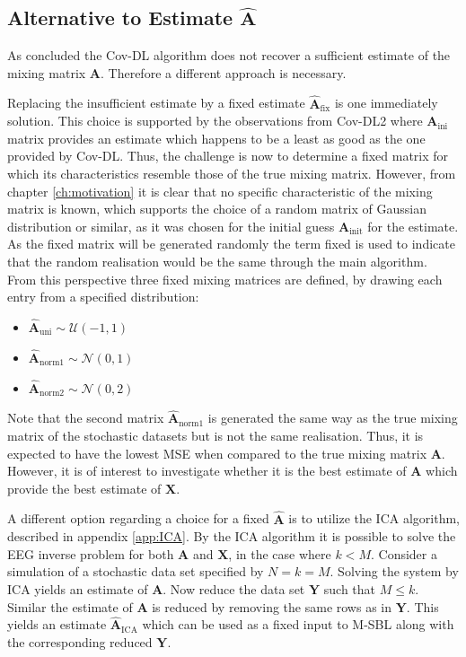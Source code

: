 \subsection{Alternative to Estimate $\hat{\textbf{A}}$}  
As concluded the Cov-DL algorithm does not recover a sufficient estimate of the mixing matrix $\mathbf{A}$. Therefore a different approach is necessary. 

Replacing the insufficient estimate by a fixed estimate $\hat{\mathbf{A}}_{\text{fix}}$ is one immediately solution. 
This choice is supported by the observations from Cov-DL2 where $\mathbf{A}_{\text{ini}}$ matrix provides an estimate which happens to be a least as good as the one provided by Cov-DL. 
Thus, the challenge is now to determine a fixed matrix for which its characteristics resemble those of the true mixing matrix. 
However, from chapter \ref{ch:motivation} it is clear that no specific characteristic of the mixing matrix is known, which supports the choice of a random matrix of Gaussian distribution or similar, as it was chosen for the initial guess $\mathbf{A}_{\text{init}}$ for the estimate. 
As the fixed matrix will be generated randomly the term fixed is used to indicate that the random realisation would be the same through the main algorithm.
From this perspective three fixed mixing matrices are defined, by drawing each entry from a specified distribution: 
\begin{itemize}
\item[] $\hat{\mathbf{A}}_{\text{uni}} \sim \mathcal{U}(-1,1)$
\item[] $\hat{\mathbf{A}}_{\text{norm1}} \sim \mathcal{N}(0,1)$                                           
\item[] $\hat{\mathbf{A}}_{\text{norm2}} \sim \mathcal{N}(0,2)$ 
\end{itemize}
Note that the second matrix $\hat{\mathbf{A}}_{\text{norm1}}$ is generated the same way as the true mixing matrix of the stochastic datasets but is not the same realisation. 
Thus, it is expected to have the lowest MSE when compared to the true mixing matrix $\mathbf{A}$. 
However, it is of interest to investigate whether it is the best estimate of $\mathbf{A}$ which provide the best estimate of $\mathbf{X}$. 

A different option regarding a choice for a fixed $\hat{\mathbf{A}}$ is to utilize the ICA algorithm, described in appendix \ref{app:ICA}. 
By the ICA algorithm it is possible to solve the EEG inverse problem for both $\mathbf{A}$ and $\mathbf{X}$, in the case where $k < M$.
Consider a simulation of a stochastic data set specified by $N = k = M$. 
Solving the system by ICA yields an estimate of $\mathbf{A}$. 
Now reduce the data set $\mathbf{Y}$ such that $M \leq k$. 
Similar the estimate of $\mathbf{A}$ is reduced by removing the same rows as in $\mathbf{Y}$. 
This yields an estimate $\hat{\mathbf{A}}_{\text{ICA}}$ which can be used as a fixed input to M-SBL along with the corresponding reduced $\mathbf{Y}$.

